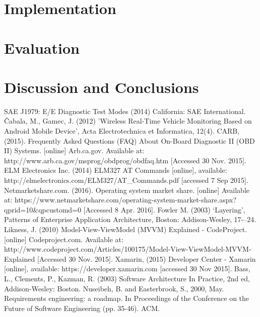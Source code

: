 \documentclass[12pt]{report}
\begin{document}
	\chapter{Implementation}
		
	\newpage

	\chapter{Evaluation}
		
	\newpage
	
	\chapter{Discussion and Conclusions}
				
	\newpage	
		
	\begin{thebibliography}{15}
		 SAE J1979:  E/E Diagnostic Test Modes (2014) California: SAE International.		
		 {\v C}abala, M., Gamec, J. (2012) 'Wireless Real-Time Vehicle Monitoring Based on Android Mobile Device', Acta Electrotechnica et Informatica, 12(4).
		 CARB, (2015). Frequently Asked Questions (FAQ) About On-Board Diagnostic II (OBD II) Systems. [online] Arb.ca.gov. Available at: http://www.arb.ca.gov/msprog/obdprog/obdfaq.htm [Accessed 30 Nov. 2015].
		 ELM Electronics Inc. (2014) ELM327 AT Commands [online], available: 	http://elmelectronics.com/ELM327/AT{\_}Commands.pdf [accessed 7 Sep 2015].
		 Netmarketshare.com. (2016). Operating system market share. [online] Available at: https://www.netmarketshare.com/operating-system-market-share.aspx?qprid=10{\&}qpcustomd=0 [Accessed 8 Apr. 2016].		
		 Fowler M. (2003) ‘Layering’, Patterns of Enterprise
	Application Architecture, Boston: Addison-Wesley, 17{-–}24.
		 Likness, J. (2010) Model-View-ViewModel (MVVM) Explained - CodeProject. [online] Codeproject.com. Available at: http://www.codeproject.com/Articles/100175/Model-View-ViewModel-MVVM-Explained [Accessed 30 Nov. 2015].
		 Xamarin, (2015) Developer Center - Xamarin [online], available: https://developer.xamarin.com [accessed 30 Nov 2015].
		 Bass, L., Clements, P., Kazman, R. (2003) Software Architecture In Practice, 2nd ed, Addison-Wesley: Boston.
		 Nuseibeh, B. and Easterbrook, S., 2000, May. Requirements engineering: a roadmap. In Proceedings of the Conference on the Future of Software Engineering (pp. 35-46). ACM.

\end{thebibliography}
\end{document}
